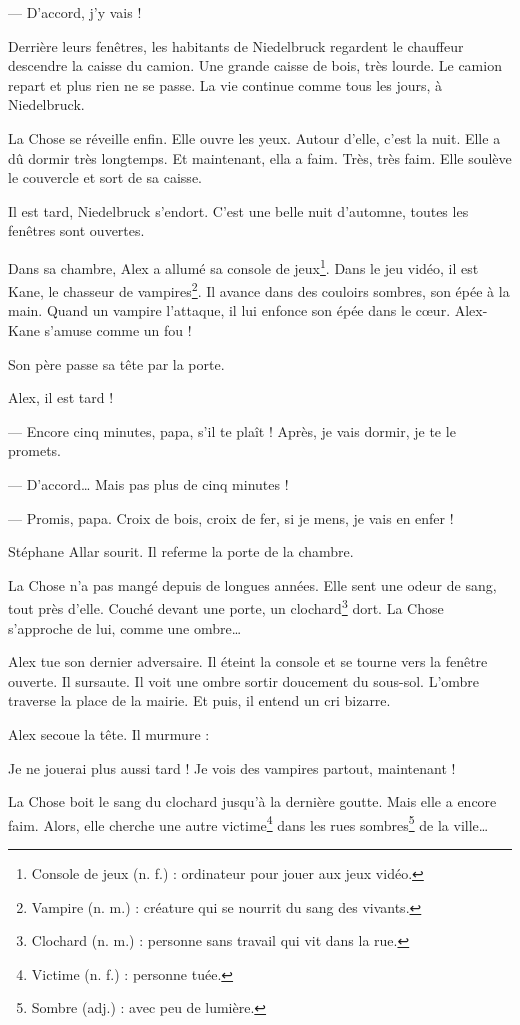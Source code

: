 --- D'accord, j'y vais ! \fg{}

Derrière leurs fenêtres, les habitants de Niedelbruck regardent le chauffeur descendre la caisse du camion. Une grande
caisse de bois, très lourde. Le camion repart et plus rien ne se passe. La vie continue comme tous les jours, à
Niedelbruck.

La Chose se réveille enfin. Elle ouvre les yeux. Autour d'elle, c'est la nuit. Elle a dû dormir très longtemps. Et
maintenant, ella a faim. Très, très faim. Elle soulève le couvercle et sort de sa caisse.

Il est tard, Niedelbruck s'endort. C'est une belle nuit d'automne, toutes les fenêtres sont ouvertes.

Dans sa chambre, Alex a allumé sa console de jeux\footnote{Console de jeux (n. f.) : ordinateur pour jouer aux jeux
vidéo.}. Dans le jeu vidéo, il est Kane, le chasseur de vampires\footnote{Vampire (n. m.) : créature qui se nourrit du
sang des vivants.}. Il avance dans des couloirs sombres, son épée à la main. Quand un vampire l'attaque, il lui enfonce
son épée dans le c\oe{}ur. Alex-Kane s'amuse comme un fou !

Son père passe sa tête par la porte.

\og Alex, il est tard !

--- Encore cinq minutes, papa, s'il te plaît ! Après, je vais dormir, je te le promets.

--- D'accord\ldots{} Mais pas plus de cinq minutes !

--- Promis, papa. Croix de bois, croix de fer, si je mens, je vais en enfer ! \fg{}

Stéphane Allar sourit. Il referme la porte de la chambre.

La Chose n'a pas mangé depuis de longues années. Elle sent une odeur de sang, tout près d'elle. Couché devant une porte,
un clochard\footnote{Clochard (n. m.) : personne sans travail qui vit dans la rue.} dort. La Chose s'approche de lui,
comme une ombre\ldots{}

Alex tue son dernier adversaire. Il éteint la console et se tourne vers la fenêtre ouverte. Il sursaute. Il voit une
ombre sortir doucement du sous-sol. L'ombre traverse la place de la mairie. Et puis, il entend un cri bizarre.

Alex secoue la tête. Il murmure :

\og Je ne jouerai plus aussi tard ! Je vois des vampires partout, maintenant ! \fg{}

La Chose boit le sang du clochard jusqu'à la dernière goutte. Mais elle a encore faim. Alors, elle cherche une autre
victime\footnote{Victime (n. f.) : personne tuée.} dans les rues sombres\footnote{Sombre (adj.) : avec peu de lumière.}
de la ville\ldots{}
